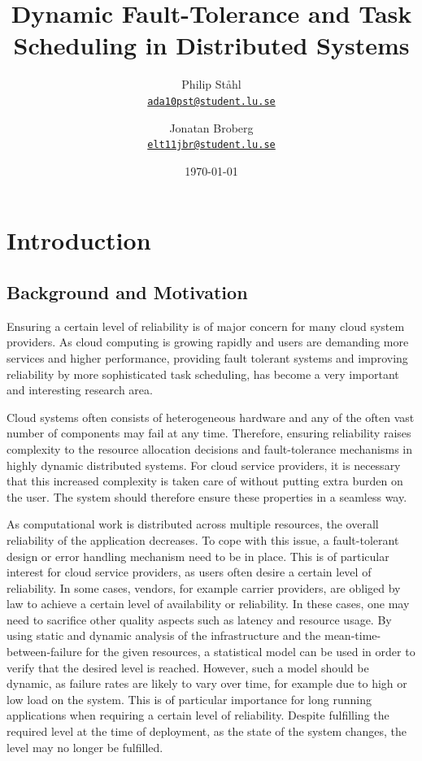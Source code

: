 \documentclass{cslthse-msc}
\author{
	Philip Ståhl \\
	{\normalsize \href{mailto:ada10pst@student.lu.se}{\texttt{ada10pst@student.lu.se}}}
	\and
	Jonatan Broberg \\
    {\normalsize \href{mailto:elt11jbr@student.lu.se
}{\texttt{elt11jbr@student.lu.se}}}
}
\title{Dynamic Fault-Tolerance and Task Scheduling in Distributed Systems}
\subtitle{}
\date{\today}
\begin{document}
\makefrontmatter

\chapter{Introduction} \label{ch:introduction} 
\section{Background and Motivation} \label{sec:introduction_backgroud_motivation}
Ensuring a certain level of reliability is of major concern for many cloud system providers. As cloud computing is growing rapidly and users are demanding more services and higher performance, providing fault tolerant systems and improving reliability by more sophisticated task scheduling, has become a very important and interesting research area. 

Cloud systems often consists of heterogeneous hardware and any of the often vast number of components may fail at any time. Therefore, ensuring reliability raises complexity to the resource allocation decisions and fault-tolerance mechanisms in highly dynamic distributed systems. For cloud service providers, it is necessary that this increased complexity is taken care of without putting extra burden on the user. The system should therefore ensure these properties in a seamless way.

As computational work is distributed across multiple resources, the overall reliability of the application decreases. To cope with this issue, a fault-tolerant design or error handling mechanism need to be in place. This is of particular interest for cloud service providers, as users often desire a certain level of reliability. In some cases, vendors, for example carrier providers, are obliged by law to achieve a certain level of availability or reliability. In these cases, one may need to sacrifice other quality aspects such as latency and resource usage. By using static and dynamic analysis of the infrastructure and the mean-time-between-failure for the given resources, a statistical model can be used in order to verify  that the desired level is reached. However, such a model should be dynamic, as failure rates are likely to vary over time, for example due to high or low load on the system. This is of particular importance for long running applications when requiring a certain level of reliability. Despite fulfilling the required level at the time of deployment, as the state of the system changes, the level may no longer be fulfilled.
\end{document}

